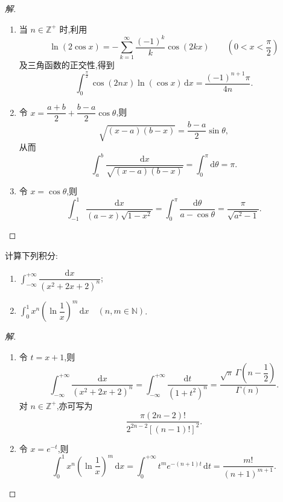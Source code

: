 \documentclass[../../数学分析培优讲义(答案版).tex]{subfiles}
\begin{document}
\begin{proof}[解]
\begin{enumerate}[label=(\arabic*)]
    \item 当 $n\in\mathbb{Z}^+$ 时,利用
    \[
        \ln(2\cos x)=-\sum\limits_{k=1}^{\infty}\dfrac{(-1)^k}{k}\cos(2kx)
        \qquad\left(0<x<\dfrac{\pi}{2}\right)
    \]
    及三角函数的正交性,得到
    \[
        \int_0^{\frac{\pi}{2}}\cos(2nx)\ln(\cos x)\,\mathrm{d}x
        =\dfrac{(-1)^{n+1}\pi}{4n}.
    \]

    \item 令 $x=\dfrac{a+b}{2}+\dfrac{b-a}{2}\cos\theta$,则
    \[
        \sqrt{(x-a)(b-x)}=\dfrac{b-a}{2}\sin\theta,
    \]
    从而
    \[
        \int_a^b\dfrac{\mathrm{d}x}{\sqrt{(x-a)(b-x)}}
        =\int_0^\pi\mathrm{d}\theta=\pi.
    \]

    \item 令 $x=\cos\theta$,则
    \[
        \int_{-1}^{1}\dfrac{\mathrm{d}x}{(a-x)\sqrt{1-x^2}}
        =\int_0^\pi\dfrac{\mathrm{d}\theta}{a-\cos\theta}
        =\dfrac{\pi}{\sqrt{a^2-1}}.
    \]
\end{enumerate}
\end{proof}

\begin{example}
计算下列积分:
\begin{enumerate}[label=(\arabic*)]
    \item $\displaystyle\int_{-\infty}^{+\infty}\dfrac{\mathrm{d}x}{(x^2+2x+2)^n}$;
    \item $\displaystyle\int_0^1x^n\left(\ln\dfrac{1}{x}\right)^m\,\mathrm{d}x\quad(n,m\in\mathbb{N})$.
\end{enumerate}
\end{example}

\begin{proof}[解]
\begin{enumerate}[label=(\arabic*)]
    \item 令 $t=x+1$,则
    \[
        \int_{-\infty}^{+\infty}\dfrac{\mathrm{d}x}{(x^2+2x+2)^n}
        =\int_{-\infty}^{+\infty}\dfrac{\mathrm{d}t}{(1+t^2)^n}
        =\dfrac{\sqrt{\pi}\,\Gamma\left(n-\dfrac{1}{2}\right)}{\Gamma(n)}.
    \]
    对 $n\in\mathbb{Z}^+$,亦可写为
    \[
        \dfrac{\pi(2n-2)!}{2^{2n-2}[(n-1)!]^2}.
    \]

    \item 令 $x=e^{-t}$,则
    \[
        \int_0^1x^n\left(\ln\dfrac{1}{x}\right)^m\,\mathrm{d}x
        =\int_0^{+\infty}t^m e^{-(n+1)t}\,\mathrm{d}t
        =\dfrac{m!}{(n+1)^{m+1}}.
    \]
\end{enumerate}
\end{proof}
\end{document}
